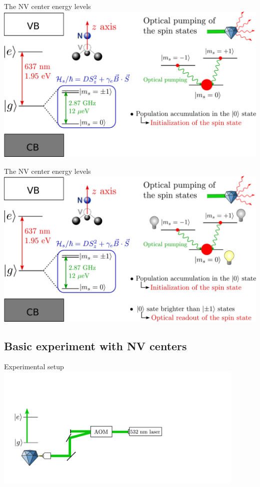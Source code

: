 \documentclass{beamer}
\begin{document}

\begin{frame}{The NV center energy levels}
\centering
\includegraphics[width=\textwidth,height=0.85\textheight,keepaspectratio]{Slide_NV_levels_1}
\end{frame}

\begin{frame}{The NV center energy levels}
\centering
\includegraphics[width=\textwidth,height=0.85\textheight,keepaspectratio]{Slide_NV_levels}
\end{frame}

\subsection{Basic experiment with NV centers}
\begin{frame}{Experimental setup}
\centering
\includegraphics[width=0.9\textwidth,height=0.85\textheight,keepaspectratio]{Slide_setup_-4}
\end{frame}
\end{document}
